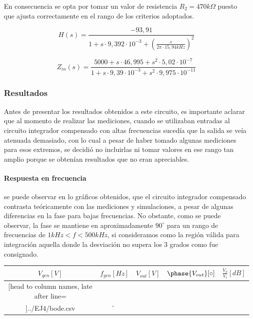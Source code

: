 En consecuencia se opta por tomar un valor de resistencia $R_2 = 470k\Omega$ puesto que ajusta correctamente en el rango de los criterios adoptados.

\begin{equation}
	H(s) = \frac{-93,91}{1 + s \cdot 9,392 \cdot 10^{-3} + \left( \frac{s}{2 \pi \cdot 15,94kHz} \right)^{2}}
\end{equation}

\begin{equation}
	Z_{in}(s) = \frac{5000 + s \cdot 46,995 + s^{2} \cdot 5,02 \cdot 10^{-7}}{1 + s \cdot 9,39 \cdot 10^{-3} + s^{2} \cdot 9,975 \cdot 10^{-11}}
\end{equation}

	\subsubsection{Resultados}
Antes de presentar los resultados obtenidos a este circuito, es importante aclarar que al momento de realizar las mediciones, cuando se utilizaban entradas
al circuito integrador compensado con altas frecuencias suced\'ia que la salida se ve\'ia atenuada demasiado, con lo cual a pesar de haber tomado algunas mediciones 
para esos extremos, se decidi\'o no incluirlas ni tomar valores en ese rango tan amplio porque se obten\'ian resultados que no eran apreciables.

\paragraph*{Respuesta en frecuencia} se puede observar en lo gr\'aficos obtenidos, que el circuito integrador compensado
contrasta te\'oricamente con las mediciones y simulaciones, a pesar de algunas diferencias en la fase para bajas frecuencias. No obstante,
como se puede observar, la fase se mantiene en aproximadamente $90^{\circ}$ para un rango de frecuencias de $ 1kHz < f < 500kHz $, si consideramos como
la regi\'on v\'alida para integraci\'on aquella donde la desviaci\'on no supera los 3 grados como fue consignado.

\begin{table}[H]
	\centering
	\begin{tabular}{c c c c c}%
		$V_{gen} [V]$ & $f_{gen} [Hz]$ & $V_{out} [V]$ & $\phase{V_{out}} [\circ]$ & $\frac{V_o}{V_i} [dB]$ \\ \hline
		\csvreader[head to column names, late after line=\\]{../EJ4/bode.csv}{}{\in & \f & \out & \p & \db}
		\hline
	\end{tabular}
\end{table}

